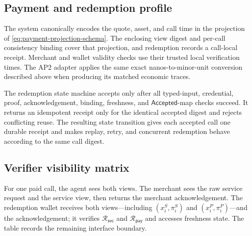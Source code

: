 \documentclass[letterpaper]{article}
\begin{document}
\subsection{Payment and redemption profile}
The system canonically encodes the quote, asset, and call time in
the projection of \cref{eq:payment-projection-schema}. The enclosing view
digest and per-call consistency binding cover that projection, and redemption
records a call-local receipt.  Merchant and wallet validity checks use their
trusted local verification times. The AP2 adapter applies the same exact
nanos-to-minor-unit conversion described above when producing its matched
economic traces.

The redemption state machine accepts only after all typed-input, credential,
proof, acknowledgement, binding, freshness, and \(\mathsf{Accepted}\)-map
checks succeed.
It returns an idempotent receipt only for the identical accepted digest and
rejects conflicting reuse. The resulting state transition gives each accepted
call one durable receipt and makes replay, retry, and concurrent redemption
behave according to the same call digest.

\subsection{Verifier visibility matrix}
For one paid call, the agent sees both views. The merchant sees the raw service
request and the service view, then returns the merchant acknowledgement. The
redemption wallet receives both views---including
\((x_i^S,\pi_i^S)\) and \((x_i^P,\pi_i^P)\)---and the acknowledgement; it
verifies \(\mathcal R_{\mathsf{svc}}\) and \(\mathcal R_{\mathsf{pay}}\) and
accesses freshness state. The table records the remaining interface boundary.
\end{document}
